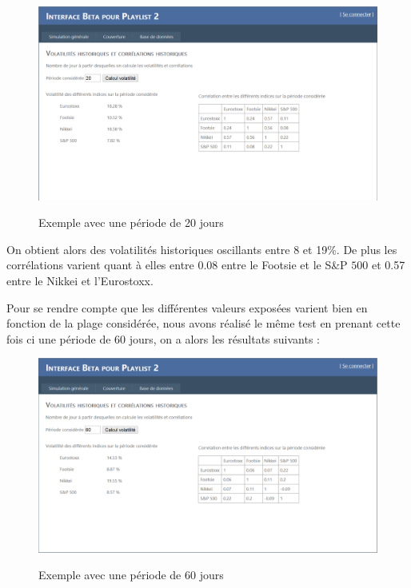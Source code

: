 \documentclass[french,12pt,a4paper]{article}
\begin{document}
\begin{center}
\begin{figure}[h!]
    \caption{Exemple avec une période de 20 jours}
    \includegraphics[scale=0.45]{Manuel2.png}
    \label{fig:PropProf}
\end{figure}
\end{center} 

On obtient alors des volatilités historiques oscillants entre 8 et 19\%. De plus les corrélations varient quant à elles entre 0.08 entre le Footsie et le S\&P $500$ et 0.57 entre le Nikkei et l'Eurostoxx.

Pour se rendre compte que les différentes valeurs exposées varient bien en fonction de la plage considérée, nous avons réalisé le même test en prenant cette fois ci une période de 60 jours, on a alors les résultats suivants :

\begin{center}
\begin{figure}[h!]
    \caption{Exemple avec une période de 60 jours}
    \includegraphics[scale=0.45]{Manuel1.png}
    \label{fig:PropProf}
\end{figure}
\end{center} 
\end{document}
